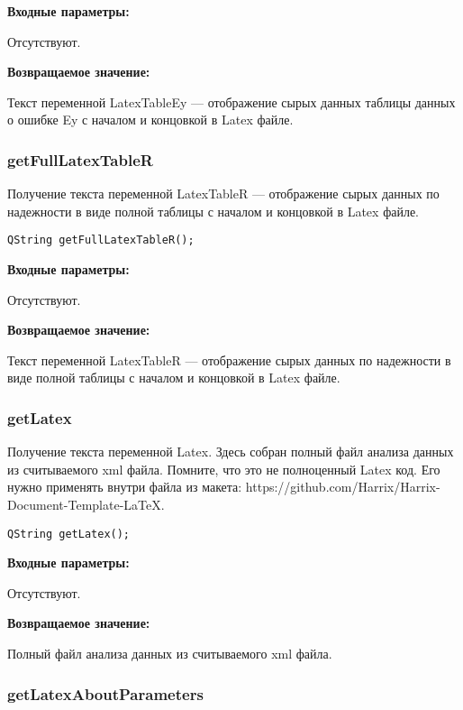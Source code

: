 \documentclass[a4paper,12pt]{article}
\begin{document}
\textbf{Входные параметры:}

Отсутствуют.

\textbf{Возвращаемое значение:}

Текст переменной LatexTableEy --- отображение сырых данных таблицы данных о ошибке Ey с началом и концовкой в Latex файле.


\subsubsection{getFullLatexTableR}\label{getFullLatexTableR}

Получение текста переменной LatexTableR --- отображение сырых данных по надежности в виде полной таблицы с началом и концовкой в Latex файле.


\begin{lstlisting}[label=code_syntax_getFullLatexTableR,caption=Синтаксис]
QString getFullLatexTableR();
\end{lstlisting}

\textbf{Входные параметры:}

Отсутствуют.

\textbf{Возвращаемое значение:}

Текст переменной LatexTableR --- отображение сырых данных по надежности в виде полной таблицы с началом и концовкой в Latex файле.


\subsubsection{getLatex}\label{getLatex}

Получение текста переменной Latex. Здесь собран полный файл анализа данных из считываемого xml файла. Помните, что это не полноценный Latex код. Его нужно применять внутри файла из макета: https://github.com/Harrix/Harrix-Document-Template-LaTeX.


\begin{lstlisting}[label=code_syntax_getLatex,caption=Синтаксис]
QString getLatex();
\end{lstlisting}

\textbf{Входные параметры:}

Отсутствуют.

\textbf{Возвращаемое значение:}

Полный файл анализа данных из считываемого xml файла.


\subsubsection{getLatexAboutParameters}\label{getLatexAboutParameters}
\end{document}
